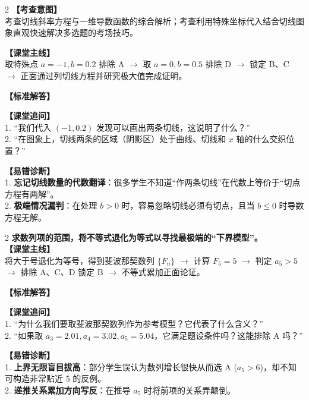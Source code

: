\documentclass[12pt,a4paper]{ctexart}
\begin{document}
\vspace{0.8em}

\begin{paracol}{2}
  \textbf{【考查意图】}\\
  考查切线斜率方程与一维导数函数的综合解析；考查利用特殊坐标代入结合切线图象直观快速解决多选题的考场技巧。
  
  \textbf{【课堂主线】}\\
  取特殊点 \(a=-1, b=0.2\) 排除 A \(\to\) 取 \(a=0, b=0.5\) 排除 D \(\to\) 锁定 B、C \(\to\) 正面通过列切线方程并研究极大值完成证明。
  
  \textbf{【标准解答】}\\
  \qFiveSolution
  
  \textbf{【课堂追问】}\\
  1. “我们代入 \((-1, 0.2)\) 发现可以画出两条切线，这说明了什么？”\\
  2. “在图象上，切线两条的区域（阴影区）处于曲线、切线和 \(x\) 轴的什么交织位置？”
  
  \switchcolumn
  \textbf{【易错诊断】}\\
  1. \textbf{忘记切线数量的代数翻译}：很多学生不知道“作两条切线”在代数上等价于“切点方程有两解”。\\
  2. \textbf{极端情况漏判}：在处理 \(b>0\) 时，容易忽略切线必须有切点，且当 \(b \leqslant 0\) 时导数方程无解。
\end{paracol}

\vspace{0.8em}
\par{}
\vspace{0.8em}

\qEightStem
\qEightOptions

\begin{paracol}{2}
  \textbf{求数列项的范围，将不等式退化为等式以寻找最极端的“下界模型”。}\\
  
  \textbf{【课堂主线】}\\
  将大于号退化为等号，得到斐波那契数列 \(\{F_n\}\) \(\to\) 计算 \(F_5 = 5\) \(\to\) 判定 \(a_5 > 5\) \(\to\) 排除 A、C、D 锁定 B \(\to\) 不等式累加正面论证。
  
  \textbf{【标准解答】}\\
  \qEightSolution
  
  \textbf{【课堂追问】}\\
  1. “为什么我们要取斐波那契数列作为参考模型？它代表了什么含义？”\\
  2. “如果取 \(a_3=2.01, a_4=3.02, a_5=5.04\)，它满足题设条件吗？这能排除 A 吗？”
  
  \switchcolumn
  \textbf{【易错诊断】}\\
  1. \textbf{上界无限盲目拔高}：部分学生误认为数列增长很快从而选 A (\(a_5>6\))，却不知可构造非常贴近 5 的反例。\\
  2. \textbf{递推关系累加方向写反}：在推导 \(a_5\) 时将前项的关系弄颠倒。
\end{paracol}
\end{document}
